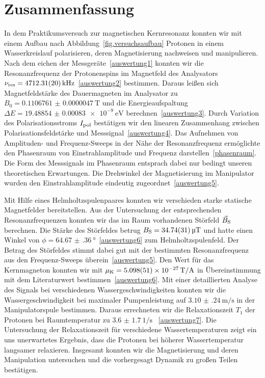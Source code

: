\documentclass[paper=a4,
	fontsize=10pt,
	DIV=18,
	twocolumn,
	parskip=half
	]{scrartcl}
\numberwithin{equation}{section}    %
\begin{document}


%
\section{Zusammenfassung}
%
In dem Praktikumsversuch zur magnetischen Kernresonanz konnten wir mit einem Aufbau nach Abbildung~\eqref{fig.versuchsaufbau} Protonen in einem Wasserkreislauf polarisieren, deren Magnetisierung nachweisen und manipulieren.
Nach dem eichen der Messgeräte~\eqref{auswertung1} konnten wir die Resonanzfrequenz der Protonenspins im Magnetfeld des Analysators $\nu_{\rm res} = \SI{4712.31(20)}{\kilo\hertz}$~\eqref{auswertung2} bestimmen.
Daraus leißen sich Magnetfeldstärke des Dauermagneten im Analysator zu $B_0 = \SI[separate-uncertainty=false]{0.1106761(47)}{\tesla}$ und die Energieaufspaltung $\Delta E = \SI[separate-uncertainty=false]{19.48854(83)e-9}{\electronvolt}$ berechnen~\eqref{auswertung3}. Durch Variation des Polarisationsstroms $I_{\rm pol}$ bestätigen wir den linearen Zusammenhang zwischen Polarisationsfeldstärke und Messsignal~\eqref{auswertung4}.
Das Aufnehmen von Amplituden- und Frequenz-Sweeps in der Nähe der Resonanzfrequenz ermöglichte den Phasenraum von Einstrahlamplitude und Frequenz darstellen~\eqref{phasenraum}. 
Die Form des Messsignals im Phasenraum entsprach dabei nur bedingt unseren theoretischen Erwartungen. 
Die Drehwinkel der Magnetisierung im Manipulator wurden den Einstrahlamplitude eindeutig zugeordnet~\eqref{auswertung5}.

 Mit Hilfe eines Helmholtzspulenpaares konnten wir verschieden starke statische Magnetfelder bereitstellen. Aus der Untersuchung der entsprechenden Resonanzfrequenzen konnten wir das im Raum vorhandenen Störfeld $\vec{B}_{\rm S}$ berechnen. Die Stärke des Störfeldes betrug $B_{\rm S} = \SI{34.74(31)}{\micro\tesla}$ und hatte einen Winkel von $\phi = \SI{64.67(36)}{\degree}$~\eqref{auswertung6} zum Helmholtzspulenfeld. 
Der Betrag des Störfeldes stimmt dabei gut mit der bestimmten Resonanzfrequenz aus den Frequenz-Sweeps überein~\eqref{auswertung5}. Den Wert für das Kernmagneton konnten wir mit $\mu_{\rm K} = \SI[separate-uncertainty=false, per-mode=symbol]{5.098(51)e-27}{\tesla\per\ampere}$ in Übereinstimmung mit dem Literaturwert bestimmen~\eqref{auswertung6}.
Mit einer detaillierten Analyse des Signals bei verschiedenen Wassergeschwindigkeiten konnten wir die Wassergeschwindigkeit bei maximaler Pumpenleistung auf $\SI[per-mode=symbol]{3.10(24)}{\meter\per\second}$ in der Manipulatorspule bestimmen. Daraus errechneten wir die Relaxationszeit $T_1$ der Protonen bei Raumtemperatur zu $\SI{3.6(17)}{1\per\second}$ ~\eqref{auswertung7}. Die Untersuchung der Relaxationszeit für verschiedene Wassertemperaturen zeigt ein uns unerwartetes Ergebnis, dass die Protonen bei höherer Wassertemperatur langsamer relaxieren. Insgesamt konnten wir die Magnetisierung und deren Manipulation  untersuchen und die vorhergesagt Dynamik zu großen Teilen bestätigen. 

\small

\nocite{*}

\normalsize
\end{document}
